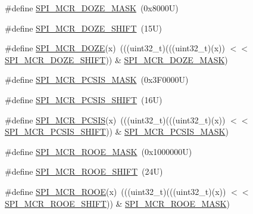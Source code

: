 \begin{DoxyCompactItemize}
\item 
\#define \mbox{\hyperlink{group___c_a_n___register___masks_ga1f301c07deb8544d117e752400e0e537}{S\+P\+I\+\_\+\+M\+C\+R\+\_\+\+D\+O\+Z\+E\+\_\+\+M\+A\+SK}}~(0x8000\+U)
\item 
\#define \mbox{\hyperlink{group___c_a_n___register___masks_gab24077f2090f26468c4ebe2ecfda7c5f}{S\+P\+I\+\_\+\+M\+C\+R\+\_\+\+D\+O\+Z\+E\+\_\+\+S\+H\+I\+FT}}~(15\+U)
\item 
\#define \mbox{\hyperlink{group___c_a_n___register___masks_ga4b82cf6a4a4b286b6ec8c1dad08c746a}{S\+P\+I\+\_\+\+M\+C\+R\+\_\+\+D\+O\+ZE}}(x)~(((uint32\+\_\+t)(((uint32\+\_\+t)(x)) $<$$<$ \mbox{\hyperlink{group___c_a_n___register___masks_gab24077f2090f26468c4ebe2ecfda7c5f}{S\+P\+I\+\_\+\+M\+C\+R\+\_\+\+D\+O\+Z\+E\+\_\+\+S\+H\+I\+FT}})) \& \mbox{\hyperlink{group___c_a_n___register___masks_ga1f301c07deb8544d117e752400e0e537}{S\+P\+I\+\_\+\+M\+C\+R\+\_\+\+D\+O\+Z\+E\+\_\+\+M\+A\+SK}})
\item 
\#define \mbox{\hyperlink{group___c_a_n___register___masks_ga69de8a51e829efc59b2a2402a8210aeb}{S\+P\+I\+\_\+\+M\+C\+R\+\_\+\+P\+C\+S\+I\+S\+\_\+\+M\+A\+SK}}~(0x3\+F0000\+U)
\item 
\#define \mbox{\hyperlink{group___c_a_n___register___masks_ga5130ba4524baa3be71b17af17b06b3e2}{S\+P\+I\+\_\+\+M\+C\+R\+\_\+\+P\+C\+S\+I\+S\+\_\+\+S\+H\+I\+FT}}~(16\+U)
\item 
\#define \mbox{\hyperlink{group___c_a_n___register___masks_ga81637c9ef8f34bdb499086de99c99858}{S\+P\+I\+\_\+\+M\+C\+R\+\_\+\+P\+C\+S\+IS}}(x)~(((uint32\+\_\+t)(((uint32\+\_\+t)(x)) $<$$<$ \mbox{\hyperlink{group___c_a_n___register___masks_ga5130ba4524baa3be71b17af17b06b3e2}{S\+P\+I\+\_\+\+M\+C\+R\+\_\+\+P\+C\+S\+I\+S\+\_\+\+S\+H\+I\+FT}})) \& \mbox{\hyperlink{group___c_a_n___register___masks_ga69de8a51e829efc59b2a2402a8210aeb}{S\+P\+I\+\_\+\+M\+C\+R\+\_\+\+P\+C\+S\+I\+S\+\_\+\+M\+A\+SK}})
\item 
\#define \mbox{\hyperlink{group___c_a_n___register___masks_ga2f3c41dcffc0058ae83ae7b1dbfffd86}{S\+P\+I\+\_\+\+M\+C\+R\+\_\+\+R\+O\+O\+E\+\_\+\+M\+A\+SK}}~(0x1000000\+U)
\item 
\#define \mbox{\hyperlink{group___c_a_n___register___masks_ga78f4dfaad41aae2ee10979f2e248e4d3}{S\+P\+I\+\_\+\+M\+C\+R\+\_\+\+R\+O\+O\+E\+\_\+\+S\+H\+I\+FT}}~(24\+U)
\item 
\#define \mbox{\hyperlink{group___c_a_n___register___masks_ga976b4b71102dac6e646d34dc6f91351b}{S\+P\+I\+\_\+\+M\+C\+R\+\_\+\+R\+O\+OE}}(x)~(((uint32\+\_\+t)(((uint32\+\_\+t)(x)) $<$$<$ \mbox{\hyperlink{group___c_a_n___register___masks_ga78f4dfaad41aae2ee10979f2e248e4d3}{S\+P\+I\+\_\+\+M\+C\+R\+\_\+\+R\+O\+O\+E\+\_\+\+S\+H\+I\+FT}})) \& \mbox{\hyperlink{group___c_a_n___register___masks_ga2f3c41dcffc0058ae83ae7b1dbfffd86}{S\+P\+I\+\_\+\+M\+C\+R\+\_\+\+R\+O\+O\+E\+\_\+\+M\+A\+SK}})
$$
\end{DoxyCompactItemize}
